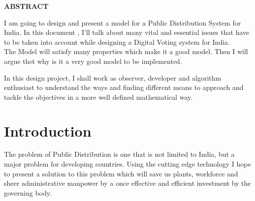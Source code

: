 \documentclass[12pt]{report}
\begin{document}
\newpage

\begin{center}
\Large \bf ABSTRACT
\end{center}
\vspace{0.2in}

I am going to design and present a model for a Public Distribution System for India. In this document , I'll talk about many vital and essential issues that have to be taken into account while designing a Digital Voting system for India. 
\\
\vspace{0.3cm}
The Model will satisfy many properties which make it a good model. Then I will argue thet why is it a very good model to be implemented.



In this design project, I shall work as observer, developer and algorithm enthusiast to understand the ways and finding different means to approach and tackle the objectives in a more well defined mathematical way. 

\vspace{0.2cm}

\newpage

\tableofcontents

\newpage

\chapter{Introduction}

The problem of Public Distribution is one that is not limited to India, but a major problem for developing countries. Using the cutting edge technology I hope to present a solution to this problem which will save us plants, workforce and sheer administrative manpower by a once effective and efficient investment by the governing body.
\\
\end{document}
